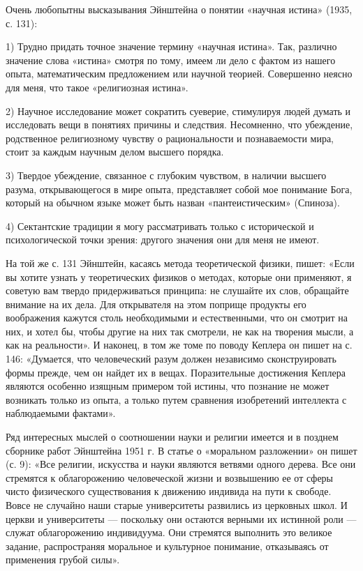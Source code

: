 Очень  любопытны высказывания  Эйнштейна  о  понятии «научная  истина»
(1935, с. 131):

1)  Трудно  придать точное  значение  термину  «научная истина».  Так,
различно  значение слова  «истина» смотря  по  тому, имеем  ли дело  с
фактом  из  нашего  опыта,  математическим  предложением  или  научной
теорией. Совершенно неясно для меня, что такое «религиозная истина».

2)  Научное исследование  может сократить  суеверие, стимулируя  людей
думать и исследовать вещи в  понятиях причины и следствия. Несомненно,
что  убеждение, родственное  религиозному чувству  о рациональности  и
познаваемости мира, стоит за каждым научным делом высшего порядка.

3) Твердое убеждение, связанное с глубоким чувством, в наличии высшего
разума, открывающегося в мире  опыта, представляет собой мое понимание
Бога,  который на  обычном языке  может быть  назван «пантеистическим»
(Спиноза).

4) Сектантские традиции  я могу рассматривать только  с исторической и
психологической точки зрения: другого значения они для меня не имеют.

На той же с. 131 Эйнштейн, касаясь метода теоретической физики, пишет:
«Если  вы хотите  узнать у  теоретических физиков  о методах,  которые
они  применяют,  я  советую  вам твердо  придерживаться  принципа:  не
слушайте их  слов, обращайте внимание  на их дела. Для  открывателя на
этом  поприще продукты  его воображения  кажутся столь  необходимыми и
естественными, что он смотрит на них,  и хотел бы, чтобы другие на них
так  смотрели, не  как  на творения  мысли, а  как  на реальности».  И
наконец,  в  том  же томе  по  поводу  Кеплера  он  пишет на  с.  146:
«Думается,  что человеческий  разум должен  независимо сконструировать
формы  прежде, чем  он  найдет их  в  вещах. Поразительные  достижения
Кеплера являются особенно изящным примером той истины, что познание не
может возникать только из опыта,  а только путем сравнения изобретений
интеллекта с наблюдаемыми фактами».

Ряд  интересных мыслей  о  соотношении  науки и  религии  имеется и  в
позднем  сборнике  работ  Эйнштейна  1951 г.  В  статье  о  «моральном
разложении» он пишет (с. 9):  «Все религии, искусства и науки являются
ветвями одного дерева. Все  они стремятся к облагорожению человеческой
жизни  и возвышению  ее  от сферы  чисто  физического существования  к
движению индивида  на пути  к свободе. Вовсе  не случайно  наши старые
университеты  развились из  церковных  школ. И  церкви и  университеты
---  поскольку  они  остаются  верными их  истинной  роли  ---  служат
облагорожению  индивидуума.   Они  стремятся  выполнить   это  великое
задание, распространяя  моральное и культурное  понимание, отказываясь
от применения грубой силы».

